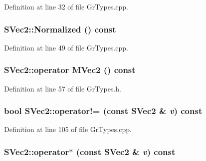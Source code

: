 Definition at line 32 of file GrTypes.cpp.\hypertarget{struct_s_vec2_f9d4f2ade78ce5c42ebeb52e92bf7547}{
\subsubsection[{Normalized}]{ SVec2::Normalized () const}}
\label{struct_s_vec2_f9d4f2ade78ce5c42ebeb52e92bf7547}




Definition at line 49 of file GrTypes.cpp.\hypertarget{struct_s_vec2_924be34ef14508228d4ef9836981ac33}{
\subsubsection[{operator MVec2}]{\setlength{\rightskip}{0pt plus 5cm}SVec2::operator {\bf MVec2} () const}}
\label{struct_s_vec2_924be34ef14508228d4ef9836981ac33}




Definition at line 57 of file GrTypes.h.\hypertarget{struct_s_vec2_fac02ca04954e66666b38fc148e20f76}{
\subsubsection[{operator!=}]{\setlength{\rightskip}{0pt plus 5cm}bool SVec2::operator!= (const {\bf SVec2} \& {\em v}) const}}
\label{struct_s_vec2_fac02ca04954e66666b38fc148e20f76}




Definition at line 105 of file GrTypes.cpp.\hypertarget{struct_s_vec2_1c9c613fc0dfc116d34ec3d036a3f134}{
\subsubsection[{operator$\ast$}]{ SVec2::operator$\ast$ (const {\bf SVec2} \& {\em v}) const}}
\label{struct_s_vec2_1c9c613fc0dfc116d34ec3d036a3f134}




